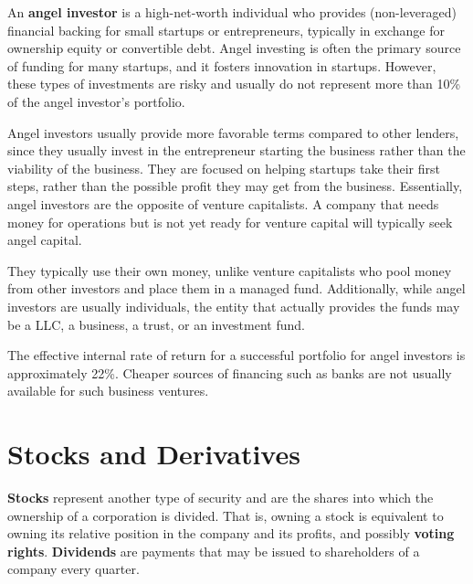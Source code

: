 \documentclass{article}
\begin{document}
    \begin{definition}
      An \textbf{angel investor} is a high-net-worth individual who provides (non-leveraged) financial backing for small startups or entrepreneurs, typically in exchange for ownership equity or convertible debt. Angel investing is often the primary source of funding for many startups, and it fosters innovation in startups. However, these types of investments are risky and usually do not represent more than 10\% of the angel investor's portfolio. 

      Angel investors usually provide more favorable terms compared to other lenders, since they usually invest in the entrepreneur starting the business rather than the viability of the business. They are focused on helping startups take their first steps, rather than the possible profit they may get from the business. Essentially, angel investors are the opposite of venture capitalists. A company that needs money for operations but is not yet ready for venture capital will typically seek angel capital. 

      They typically use their own money, unlike venture capitalists who pool money from other investors and place them in a managed fund. Additionally, while angel investors are usually individuals, the entity that actually provides the funds may be a LLC, a business, a trust, or an investment fund. 

      The effective internal rate of return for a successful portfolio for angel investors is approximately 22\%. Cheaper sources of financing such as banks are not usually available for such business ventures. 
    \end{definition}

\section{Stocks and Derivatives}

  \textbf{Stocks} represent another type of security and are the shares into which the ownership of a corporation is divided. That is, owning a stock is equivalent to owning its relative position in the company and its profits, and possibly \textbf{voting rights}. \textbf{Dividends} are payments that may be issued to shareholders of a company every quarter. 
\end{document}
